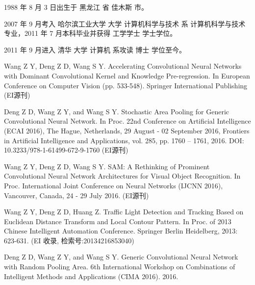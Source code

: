 \begin{resume}


  1988 年 8 月 3 日出生于 黑龙江 省  佳木斯 市。

  2007 年 9 月考入 哈尔滨工业大学 大学 计算机科学与技术 系 计算机科学与技术 专业，2011 年 7 月本科毕业并获得 工学学士 学士学位。

  2011 年 9 月进入 清华 大学 计算机 系攻读 博士 学位至今。


  \begin{publications}
    \item Wang Z Y, Deng Z D, Wang S Y. Accelerating Convolutional Neural Networks with Dominant Convolutional Kernel and Knowledge Pre-regression. In European Conference on Computer Vision (pp. 533-548). Springer International Publishing (EI源刊)
    \item Deng Z D, Wang Z Y, and Wang S Y. Stochastic Area Pooling for Generic Convolutional Neural Network. In Proc. 22nd Conference on Artificial Intelligence (ECAI 2016),  The Hague, Netherlands, 29 August - 02 September 2016, Frontiers in Artificial Intelligence and Applications, vol. 285, pp. 1760 – 1761, 2016. DOI: 10.3233/978-1-61499-672-9-1760 (EI源刊)
     \item Wang Z Y, Deng Z D, Wang S Y. SAM: A Rethinking of Prominent Convolutional Neural Network Architectures for Visual Object Recognition. In Proc. International Joint Conference on Neural Networks (IJCNN 2016), Vancouver, Canada, 24 - 29 July 2016. (EI源刊)
     \item Wang Z Y, Deng Z D, Huang Z. Traffic Light Detection and Tracking Based on Euclidean Distance Transform and Local Contour Pattern. In Proc. of 2013 Chinese Intelligent Automation Conference. Springer Berlin Heidelberg, 2013: 623-631. (EI 收录,  检索号:20134216853040)
      \item Deng Z D, Wang Z Y, and Wang S Y. Generic Convolutional Neural Network with Random Pooling Area. 6th International Workshop on Combinations of Intelligent Methods and Applications (CIMA 2016). 2016.
  \end{publications}



\end{resume}
